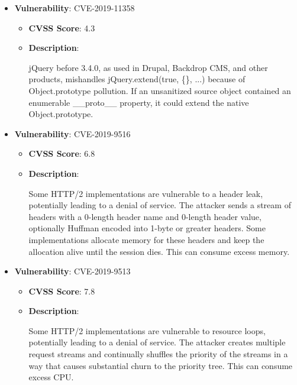 \documentclass{article}
\begin{document}
\begin{itemize}
        \item \textbf{Vulnerability}: CVE-2019-11358
        \begin{itemize}
            \item \textbf{CVSS Score}:  4.3 
            \item \textbf{Description}:
            \parbox[t]{0.9\linewidth}{
                \ttfamily jQuery before 3.4.0, as used in Drupal, Backdrop CMS, and other products, mishandles jQuery.extend(true, \{\}, ...) because of Object.prototype pollution. If an unsanitized source object contained an enumerable \_\_proto\_\_ property, it could extend the native Object.prototype.
            }
        \end{itemize}
    
        \item \textbf{Vulnerability}: CVE-2019-9516
        \begin{itemize}
            \item \textbf{CVSS Score}:  6.8 
            \item \textbf{Description}:
            \parbox[t]{0.9\linewidth}{
                \ttfamily Some HTTP/2 implementations are vulnerable to a header leak, potentially leading to a denial of service. The attacker sends a stream of headers with a 0-length header name and 0-length header value, optionally Huffman encoded into 1-byte or greater headers. Some implementations allocate memory for these headers and keep the allocation alive until the session dies. This can consume excess memory.
            }
        \end{itemize}
    
        \item \textbf{Vulnerability}: CVE-2019-9513
        \begin{itemize}
            \item \textbf{CVSS Score}:  7.8 
            \item \textbf{Description}:
            \parbox[t]{0.9\linewidth}{
                \ttfamily Some HTTP/2 implementations are vulnerable to resource loops, potentially leading to a denial of service. The attacker creates multiple request streams and continually shuffles the priority of the streams in a way that causes substantial churn to the priority tree. This can consume excess CPU.
            }
        \end{itemize}
    

\end{itemize}
\end{document}
